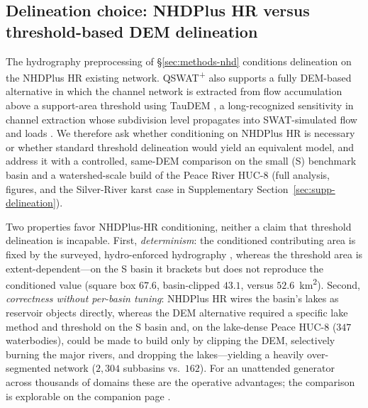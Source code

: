 \subsection{Delineation choice: NHDPlus HR versus threshold-based DEM delineation}
\label{sec:methods-delineation}

The hydrography preprocessing of \S\ref{sec:methods-nhd} conditions delineation on the NHDPlus HR existing network. QSWAT\textsuperscript{+} \citep{QSWATplusSoftware} also supports a fully DEM-based alternative in which the channel network is extracted from flow accumulation above a support-area threshold using TauDEM \citep{Tarboton1997TauDEM}, a long-recognized sensitivity in channel extraction whose subdivision level propagates into SWAT-simulated flow and loads \citep{Tarboton1991ChannelNetworks, Jha2004Subdivision, Chaplot2005DEMmesh}. We therefore ask whether conditioning on NHDPlus HR is necessary or whether standard threshold delineation would yield an equivalent model, and address it with a controlled, same-DEM comparison on the small (S) benchmark basin and a watershed-scale build of the Peace River HUC-8 (full analysis, figures, and the Silver-River karst case in Supplementary Section~\ref{sec:supp-delineation}).

Two properties favor NHDPlus-HR conditioning, neither a claim that threshold delineation is incapable. First, \emph{determinism}: the conditioned contributing area is fixed by the surveyed, hydro-enforced hydrography \citep{Moore2019NHDPlusHR, Lindsay2016StreamBurning}, whereas the threshold area is extent-dependent---on the S basin it brackets but does not reproduce the conditioned value (square box $67.6$, basin-clipped $43.1$, versus $52.6$~km\textsuperscript{2}). Second, \emph{correctness without per-basin tuning}: NHDPlus HR wires the basin's lakes as reservoir objects directly, whereas the DEM alternative required a specific lake method and threshold on the S basin and, on the lake-dense Peace HUC-8 ($347$ waterbodies), could be made to build only by clipping the DEM, selectively burning the major rivers, and dropping the lakes---yielding a heavily over-segmented network ($2{,}304$ subbasins vs.\ $162$). For an unattended generator across thousands of domains these are the operative advantages; the comparison is explorable on the companion page \citep{SWATGenXcompanion}.
